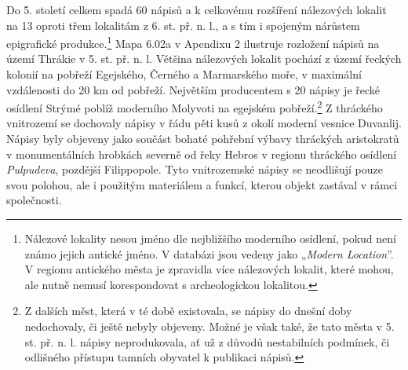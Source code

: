 Do 5. století celkem spadá 60 nápisů a k celkovému rozšíření nálezových lokalit na 13 oproti třem lokalitám z 6. st. př. n. l., a s tím i spojeným nárůstem epigrafické produkce.\footnote{Nálezové lokality nesou jméno dle nejbližšího moderního osídlení, pokud není známo jejich antické jméno. V databázi jsou vedeny jako „{\em Modern Location}”. V regionu antického města je zpravidla více nálezových lokalit, které mohou, ale nutně nemusí korespondovat s archeologickou lokalitou.} Mapa 6.02a v Apendixu 2 ilustruje rozložení nápisů na území Thrákie v 5. st. př. n. l. Většina nálezových lokalit pochází z území řeckých kolonií na pobřeží Egejského, Černého a Marmarského moře, v maximální vzdálenosti do 20 km od pobřeží. Největším producentem s 20 nápisy je řecké osídlení Strýmé poblíž moderního Molyvoti na egejském pobřeží.\footnote{Z dalších měst, která v té době existovala, se nápisy do dnešní doby nedochovaly, či ještě nebyly objeveny. Možné je však také, že tato města v 5. st. př. n. l. nápisy neprodukovala, ať už z důvodů nestabilních podmínek, či odlišného přístupu tamních obyvatel k publikaci nápisů.} Z thráckého vnitrozemí se dochovaly nápisy v řádu pěti kusů z okolí moderní vesnice Duvanlij. Nápisy byly objeveny jako součást bohaté pohřební výbavy thráckých aristokratů v monumentálních hrobkách severně od řeky Hebros v regionu thráckého osídlení {\em Pulpudeva}, pozdější Filippopole. Tyto vnitrozemské nápisy se neodlišují pouze svou polohou, ale i použitým materiálem a funkcí, kterou objekt zastával v rámci společnosti.

